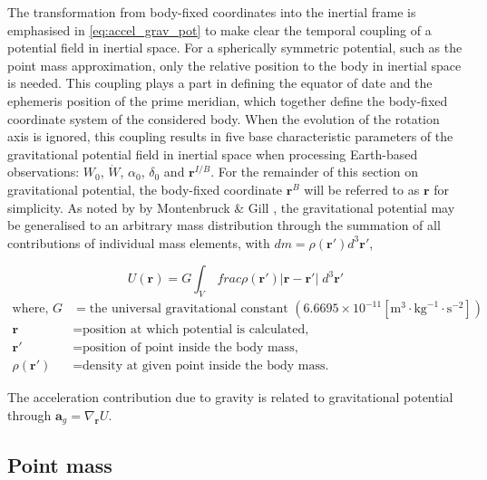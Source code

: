 The transformation from body-fixed coordinates into the inertial frame is
emphasised in \autoref{eq:accel_grav_pot} to make clear the temporal coupling of
a potential field in inertial space. For a spherically symmetric potential, such
as the point mass approximation, only the relative position to the body in
inertial space is needed. This coupling plays a part in defining the equator of
date and the ephemeris position of the prime meridian, which together define the
body-fixed coordinate system of the considered body. When the evolution of the
rotation axis is ignored, this coupling results in five base characteristic
parameters of the gravitational potential field in inertial space when
processing Earth-based observations: $W_0$, $\dot{W}$, $\alpha_0$, $\delta_0$
and $\mathbf{r}^{I/B}$. For the remainder of this section on gravitational
potential, the body-fixed coordinate $\mathbf{r}^B$ will be referred to as
$\mathbf{r}$ for simplicity. As noted by by Montenbruck \& Gill
\cite{Montenbruck2000}, the gravitational potential may be generalised to an
arbitrary mass distribution through the summation of all contributions of
individual mass elements, with $dm=\rho{(\mathbf{r'})}d^3\mathbf{r'}$,

\begin{equation}
    U(\mathbf{r}) = G\int_V\ frac{\rho{(\mathbf{r'})}}{|\mathbf{r}-\mathbf{r'}|}\;d^3\mathbf{r'}
\end{equation}
\begin{equation*}
    \begin{aligned}
        \textrm{where, }
        G &= \textrm{the universal gravitational constant }(6.6695\times{}10^{−11} [\textrm{m}^3\cdot{}\textrm{kg}^{-1}\cdot{}\textrm{s}^{-2}])\\
        \mathbf{r}       &= \textrm{position at which potential is calculated,} \\
        \mathbf{r'}       &= \textrm{position of point inside the body mass,}\\
        \rho(\mathbf{r'}) &= \textrm{density at given point inside the body mass.}
    \end{aligned}
\end{equation*}

The acceleration contribution due to gravity is related to gravitational
potential through $\mathbf{a}_g=\nabla_\mathbf{r}{U}$.

\subsection{Point mass}

